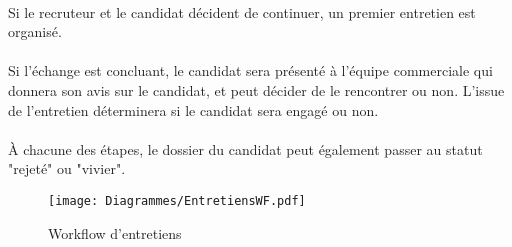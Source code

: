 \paragraph{} Si le recruteur et le candidat décident de continuer, un premier entretien est organisé. 
\paragraph{} Si l'échange est concluant, le candidat sera présenté à l'équipe commerciale qui donnera son avis sur le candidat, et peut décider de le rencontrer ou non. L'issue de l'entretien déterminera si le candidat sera engagé ou non. 
\paragraph{}À chacune des étapes, le dossier du candidat peut également passer au statut "rejeté" ou "vivier".


\begin{figure}
	\begin{sideways}
	\centering
	\texttt{[image: Diagrammes/EntretiensWF.pdf]}
	\end{sideways}
	\caption{Workflow d'entretiens}
	\label{entretiens}	
\end{figure}